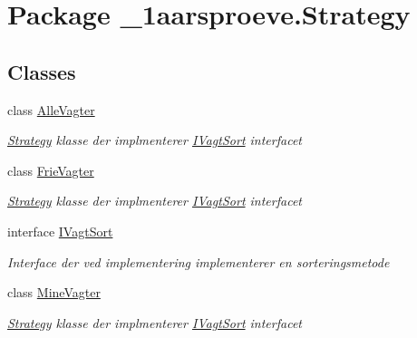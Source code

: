 \hypertarget{namespace__1aarsproeve_1_1_strategy}{}\section{Package \+\_\+1aarsproeve.\+Strategy}
\label{namespace__1aarsproeve_1_1_strategy}
\subsection*{Classes}
\begin{DoxyCompactItemize}
\item 
class \hyperlink{class__1aarsproeve_1_1_strategy_1_1_alle_vagter}{Alle\+Vagter}
\begin{DoxyCompactList}\small\item\em \hyperlink{namespace__1aarsproeve_1_1_strategy}{Strategy} klasse der implmenterer \hyperlink{interface__1aarsproeve_1_1_strategy_1_1_i_vagt_sort}{I\+Vagt\+Sort} interfacet \end{DoxyCompactList}\item 
class \hyperlink{class__1aarsproeve_1_1_strategy_1_1_frie_vagter}{Frie\+Vagter}
\begin{DoxyCompactList}\small\item\em \hyperlink{namespace__1aarsproeve_1_1_strategy}{Strategy} klasse der implmenterer \hyperlink{interface__1aarsproeve_1_1_strategy_1_1_i_vagt_sort}{I\+Vagt\+Sort} interfacet \end{DoxyCompactList}\item 
interface \hyperlink{interface__1aarsproeve_1_1_strategy_1_1_i_vagt_sort}{I\+Vagt\+Sort}
\begin{DoxyCompactList}\small\item\em Interface der ved implementering implementerer en sorteringsmetode \end{DoxyCompactList}\item 
class \hyperlink{class__1aarsproeve_1_1_strategy_1_1_mine_vagter}{Mine\+Vagter}
\begin{DoxyCompactList}\small\item\em \hyperlink{namespace__1aarsproeve_1_1_strategy}{Strategy} klasse der implmenterer \hyperlink{interface__1aarsproeve_1_1_strategy_1_1_i_vagt_sort}{I\+Vagt\+Sort} interfacet \end{DoxyCompactList}\end{DoxyCompactItemize}
